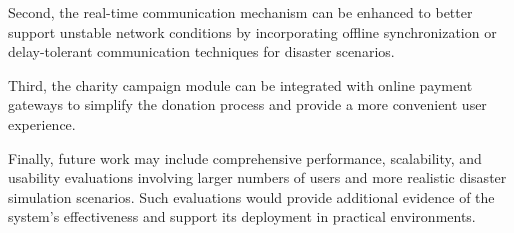 \documentclass[../Main.tex]{subfiles}
\begin{document}
Second, the real-time communication mechanism can be enhanced to better support unstable network conditions by incorporating offline synchronization or delay-tolerant communication techniques for disaster scenarios.

Third, the charity campaign module can be integrated with online payment gateways to simplify the donation process and provide a more convenient user experience.

Finally, future work may include comprehensive performance, scalability, and usability evaluations involving larger numbers of users and more realistic disaster simulation scenarios. Such evaluations would provide additional evidence of the system's effectiveness and support its deployment in practical environments.



\end{document}
